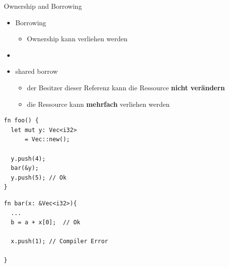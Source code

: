 \documentclass{beamer}
\begin{document}
\begin{frame}[fragile]{Ownership and Borrowing}
	\begin{itemize}
	    \item Borrowing
	    \begin{itemize}
	        \item Ownership kann verliehen werden
	    \end{itemize}
	    \item[]
	    \pause
	    \item shared borrow  
	    \begin{itemize}
	      \item der Besitzer dieser Referenz kann die Ressource \textbf{nicht verändern} 
	      \item die Ressource kann \textbf{mehrfach} verliehen werden
	      \pause
	    \end{itemize}
	\end{itemize}
\begin{center}
\hspace{3pt}
\begin{minipage}[t]{.47\textwidth}
\begin{lstlisting}
fn foo() {	
  let mut y: Vec<i32> 
      = Vec::new();
		
  y.push(4);	
  bar(&y);	
  y.push(5); // Ok
}
\end{lstlisting}				
\end{minipage}
\hspace{3pt}
\begin{minipage}[t]{.47\textwidth}
\begin{lstlisting}
fn bar(x: &Vec<i32>){
  ...	
  b = a + x[0];  // Ok	
	
  x.push(1); // Compiler Error
	
}
\end{lstlisting}				
\end{minipage}
\end{center}
\end{frame}
\end{document}
